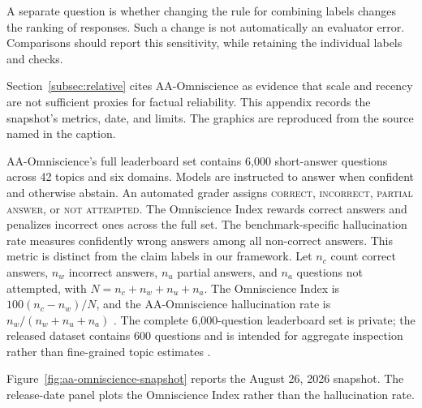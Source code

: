 \documentclass{clv2025}
\begin{document}
A separate question is whether changing the rule for combining labels changes
the ranking of responses. Such a change is not automatically an evaluator
error. Comparisons should report this sensitivity, while retaining the
individual labels and checks.

%
\makeatletter\def\@currentlabel{B}\makeatother\label{app:omniscience}

Section~\ref{subsec:relative} cites AA-Omniscience as evidence that scale and
recency are not sufficient proxies for factual reliability.
This appendix records the snapshot's metrics, date, and limits. The graphics
are reproduced from the source named in the caption.

AA-Omniscience's full leaderboard set contains 6,000 short-answer questions
across 42 topics and six domains.
Models are instructed to answer when confident and otherwise abstain. An
automated grader assigns \textsc{correct}, \textsc{incorrect},
\textsc{partial answer}, or \textsc{not attempted}. The Omniscience Index
rewards correct answers and penalizes incorrect ones across the full set. The
benchmark-specific hallucination rate measures confidently wrong answers among
all non-correct answers. This metric is distinct from the claim labels in
our framework. Let $n_c$ count correct answers, $n_w$ incorrect answers,
$n_u$ partial answers, and $n_a$ questions not attempted, with
$N=n_{c}+n_{w}+n_{u}+n_{a}$. The Omniscience Index is
$100(n_{c}-n_{w})/N$, and the AA-Omniscience hallucination rate is
$n_{w}/(n_{w}+n_{u}+n_{a})$ \citep{jackson_aaomniscience_2025}.
The complete 6,000-question leaderboard set is private; the released dataset
contains 600 questions and is intended for aggregate inspection rather than
fine-grained topic estimates
\citep{artificialanalysis_aaomniscience_public_2025}.

Figure~\ref{fig:aa-omniscience-snapshot} reports the August 26, 2026 snapshot.
The release-date panel plots the Omniscience Index rather than the
hallucination rate.
\end{document}
